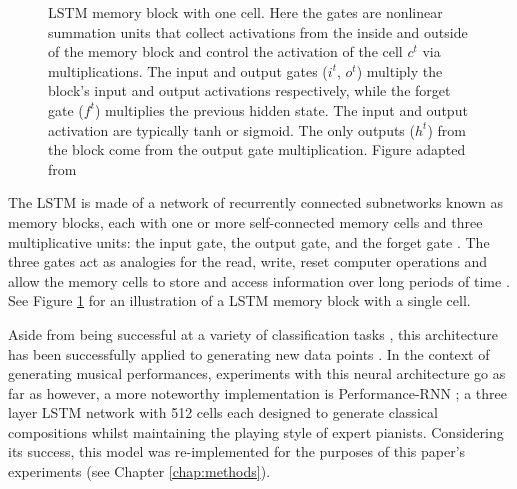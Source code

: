\documentclass[a4paper]{book}
\begin{document}
\begin{figure}[t]
    \caption{LSTM memory block with one cell. Here the gates are nonlinear summation units that collect activations from the inside and outside of the memory block and control the activation of the cell $c^t$ via multiplications. The input and output gates ($i^t$, $o^t$) multiply the block's input and output activations respectively, while the forget gate ($f^t$) multiplies the previous hidden state. The input and output activation are typically tanh or sigmoid. The only outputs ($h^t$) from the block come from the output gate multiplication. Figure adapted from \textcite{graves_supervised_2012}}
    \label{fig:lstm}
\end{figure}

The LSTM is made of a network of recurrently connected subnetworks known as memory blocks, each with one or more self-connected memory cells and three multiplicative units: the input gate, the output gate, and the forget gate \parencite{hochreiter_long_1997}. The three gates act as analogies for the read, write, reset computer operations and allow the memory cells to store and access information over long periods of time \parencite{graves_supervised_2012}. See Figure \ref{fig:lstm} for an illustration of a LSTM memory block with a single cell.

Aside from being successful at a variety of classification tasks \parencite[e.g.,][]{graves_framewise_2005}, this architecture has been successfully applied to generating new data points \parencite[such as creating sequences of text;][]{graves_generating_2013}. In the context of generating musical performances, experiments with this neural architecture go as far as \textcite{eck_first_2002} however, a more noteworthy implementation is Performance-RNN \parencite{oore_this_2018}; a three layer LSTM network with 512 cells each designed to generate classical compositions whilst maintaining the playing style of expert pianists. Considering its success, this model was re-implemented for the purposes of this paper's experiments (see Chapter \ref{chap:methods}).
\end{document}
